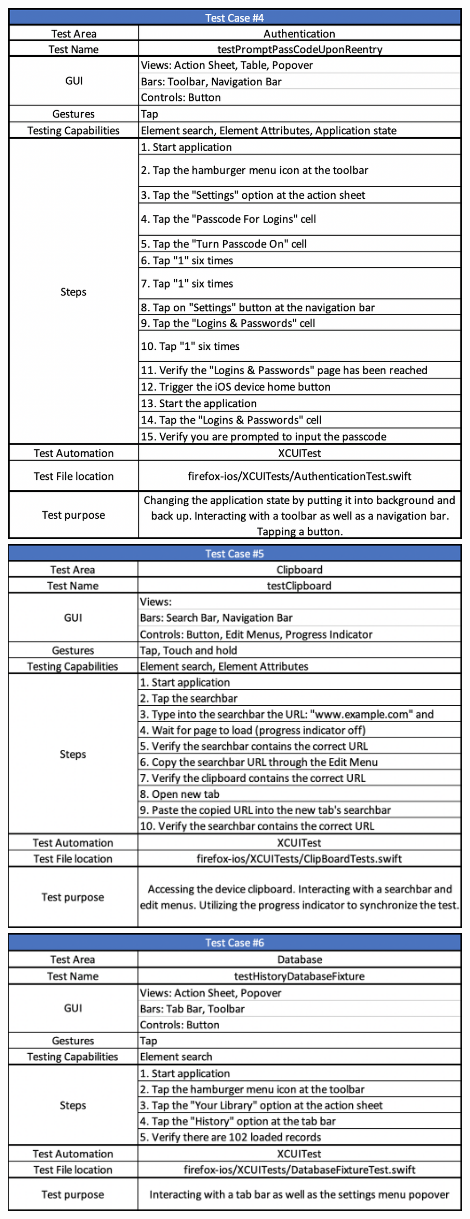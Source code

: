 \includegraphics[width=12cm]{img/tc4.png} \\[2mm]
\includegraphics[width=12cm]{img/tc5.png} \\[2mm]
\includegraphics[width=12cm]{img/tc6.png} \\[2mm]
